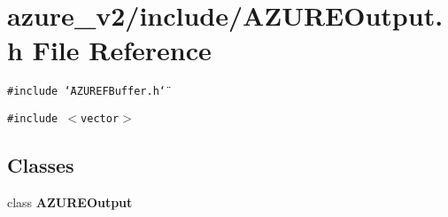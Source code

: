 \section{azure\_\-v2/include/AZUREOutput.h File Reference}
\label{AZUREOutput_8h}
{\tt \#include \char`\"{}AZUREFBuffer.h\char`\"{}}\par
{\tt \#include $<$vector$>$}\par
\subsection*{Classes}
\begin{CompactItemize}
\item 
class \bf{AZUREOutput}
\end{CompactItemize}
